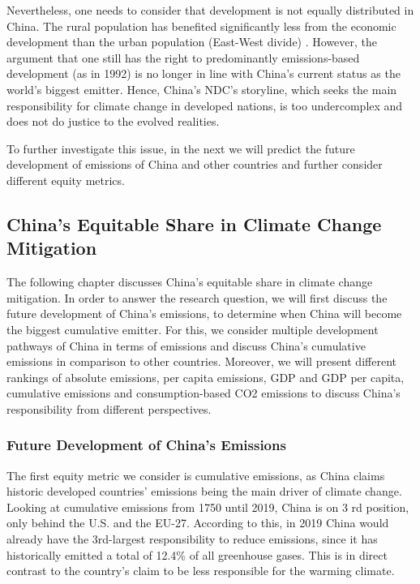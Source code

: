 \documentclass[
  12pt,
]{article}
\numberwithin{equation}{section}
\numberwithin{table}{section}
\numberwithin{figure}{section}
\begin{document}
Nevertheless, one needs to consider that development is not equally
distributed in China. The rural population has benefited significantly
less from the economic development than the urban population (East-West
divide) \citep{Knight2004}. However, the argument that one still has the
right to predominantly emissions-based development (as in 1992) is no
longer in line with China's current status as the world's biggest
emitter. Hence, China's NDC's storyline, which seeks the main
responsibility for climate change in developed nations, is too
undercomplex and does not do justice to the evolved realities.

To further investigate this issue, in the next we will predict the
future development of emissions of China and other countries and further
consider different equity metrics.

\hypertarget{chinas-equitable-share-in-climate-change-mitigation}{%
\subsection{China's Equitable Share in Climate Change
Mitigation}\label{chinas-equitable-share-in-climate-change-mitigation}}

The following chapter discusses China's equitable share in climate
change mitigation. In order to answer the research question, we will
first discuss the future development of China's emissions, to determine
when China will become the biggest cumulative emitter. For this, we
consider multiple development pathways of China in terms of emissions
and discuss China's cumulative emissions in comparison to other
countries. Moreover, we will present different rankings of absolute
emissions, per capita emissions, GDP and GDP per capita, cumulative
emissions and consumption-based CO2 emissions to discuss China's
responsibility from different perspectives.

\hypertarget{future-development-of-chinas-emissions}{%
\subsubsection{Future Development of China's
Emissions}\label{future-development-of-chinas-emissions}}

The first equity metric we consider is cumulative emissions, as China
claims historic developed countries' emissions being the main driver of
climate change. Looking at cumulative emissions from 1750 until 2019,
China is on 3 rd position, only behind the U.S. and the EU-27. According
to this, in 2019 China would already have the 3rd-largest responsibility
to reduce emissions, since it has historically emitted a total of 12.4\%
of all greenhouse gases. This is in direct contrast to the country's
claim to be less responsible for the warming climate.
\end{document}
